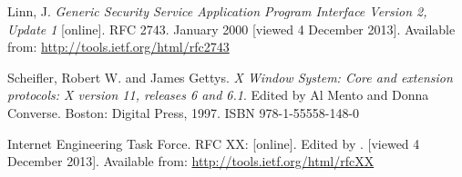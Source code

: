 \begin{thebibliography}{99}
	{\sc Linn,} J.
	\emph{Generic Security Service Application Program Interface Version 2, Update 1}
	[online].
	RFC 2743.
	January 2000 [viewed 4 December 2013].
	Available from: \url{http://tools.ietf.org/html/rfc2743}

	{\sc Scheifler,} Robert W. and James {\sc Gettys}.
	\emph{X Window System: Core and extension protocols: X version 11, releases 6 and 6.1}.
	Edited by Al Mento and Donna Converse.
	Boston: Digital Press, 1997.
	ISBN 978-1-55558-148-0

	{\sc Internet Engineering Task Force}.
	RFC XX:
	\emph{}
	[online].
	Edited by .
	 [viewed 4 December 2013].
	Available from: \url{http://tools.ietf.org/html/rfcXX}


\end{thebibliography}
